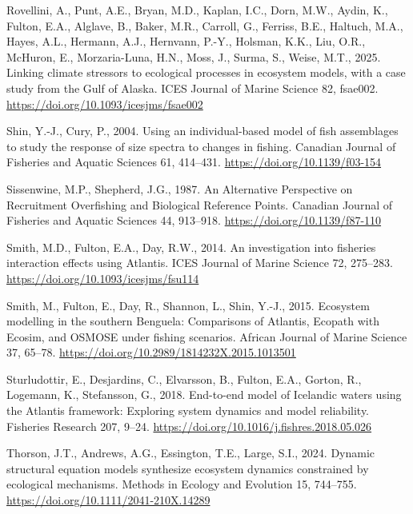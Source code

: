\documentclass[
]{article}
\newlength{\cslhangindent}
\newenvironment{CSLReferences}[2] %
 {\begin{list}{}{%
  \setlength{\itemindent}{0pt}
  \setlength{\leftmargin}{0pt}
  \setlength{\parsep}{0pt}
  \ifodd #1
   \setlength{\leftmargin}{\cslhangindent}
   \setlength{\itemindent}{-1\cslhangindent}
  \fi
  \setlength{\itemsep}{#2\baselineskip}}}
 {\end{list}}
\begin{document}
\begin{CSLReferences}{1}{0}
Rovellini, A., Punt, A.E., Bryan, M.D., Kaplan, I.C., Dorn, M.W., Aydin, K., Fulton, E.A., Alglave, B., Baker, M.R., Carroll, G., Ferriss, B.E., Haltuch, M.A., Hayes, A.L., Hermann, A.J., Hernvann, P.-Y., Holsman, K.K., Liu, O.R., McHuron, E., Morzaria-Luna, H.N., Moss, J., Surma, S., Weise, M.T., 2025. Linking climate stressors to ecological processes in ecosystem models, with a case study from the {Gulf} of {Alaska}. ICES Journal of Marine Science 82, fsae002. \url{https://doi.org/10.1093/icesjms/fsae002}

Shin, Y.-J., Cury, P., 2004. Using an individual-based model of fish assemblages to study the response of size spectra to changes in fishing. Canadian Journal of Fisheries and Aquatic Sciences 61, 414--431. \url{https://doi.org/10.1139/f03-154}

Sissenwine, M.P., Shepherd, J.G., 1987. An {Alternative Perspective} on {Recruitment Overfishing} and {Biological Reference Points}. Canadian Journal of Fisheries and Aquatic Sciences 44, 913--918. \url{https://doi.org/10.1139/f87-110}

Smith, M.D., Fulton, E.A., Day, R.W., 2014. An investigation into fisheries interaction effects using {Atlantis}. ICES Journal of Marine Science 72, 275--283. \url{https://doi.org/10.1093/icesjms/fsu114}

Smith, M., Fulton, E., Day, R., Shannon, L., Shin, Y.-J., 2015. Ecosystem modelling in the southern {Benguela}: Comparisons of {Atlantis}, {Ecopath} with {Ecosim}, and {OSMOSE} under fishing scenarios. African Journal of Marine Science 37, 65--78. \url{https://doi.org/10.2989/1814232X.2015.1013501}

Sturludottir, E., Desjardins, C., Elvarsson, B., Fulton, E.A., Gorton, R., Logemann, K., Stefansson, G., 2018. End-to-end model of {Icelandic} waters using the {Atlantis} framework: {Exploring} system dynamics and model reliability. Fisheries Research 207, 9--24. \url{https://doi.org/10.1016/j.fishres.2018.05.026}

Thorson, J.T., Andrews, A.G., Essington, T.E., Large, S.I., 2024. Dynamic structural equation models synthesize ecosystem dynamics constrained by ecological mechanisms. Methods in Ecology and Evolution 15, 744--755. \url{https://doi.org/10.1111/2041-210X.14289}


\end{CSLReferences}
\end{document}
